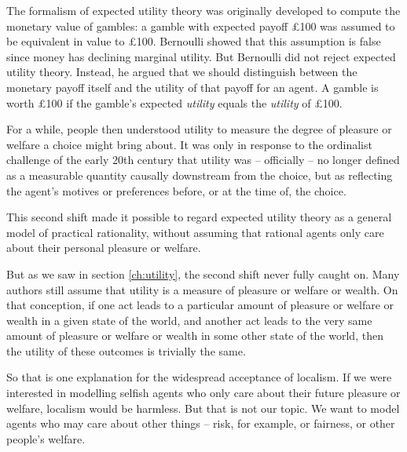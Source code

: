 The formalism of expected utility theory was originally developed to
compute the monetary value of gambles: a gamble with expected payoff
£100 was assumed to be equivalent in value to £100. Bernoulli showed
that this assumption is false since money has declining marginal
utility. But Bernoulli did not reject expected utility
theory. Instead, he argued that we should distinguish between the
monetary payoff itself and the utility of that payoff for an agent. A
gamble is worth £100 if the gamble's expected \emph{utility} equals
the \emph{utility} of £100.

For a while, people then understood utility to measure the degree of
pleasure or welfare a choice might bring about. It was only in
response to the ordinalist challenge of the early 20th century that
utility was -- officially -- no longer defined as a measurable
quantity causally downstream from the choice, but as reflecting the
agent's motives or preferences before, or at the time of, the choice.

This second shift made it possible to regard expected utility theory
as a general model of practical rationality, without assuming that
rational agents only care about their personal pleasure or welfare.

But as we saw in section \ref{ch:utility}, the second shift never
fully caught on. Many authors still assume that utility is a measure
of pleasure or welfare or wealth. On that conception, if one act leads
to a particular amount of pleasure or welfare or wealth in a given
state of the world, and another act leads to the very same amount of
pleasure or welfare or wealth in some other state of the world, then
the utility of these outcomes is trivially the same. 

So that is one explanation for the widespread acceptance of
localism. If we were interested in modelling selfish agents who only
care about their future pleasure or welfare, localism would be
harmless. But that is not our topic. We want to model agents who may
care about other things -- risk, for example, or fairness, or other
people's welfare.

